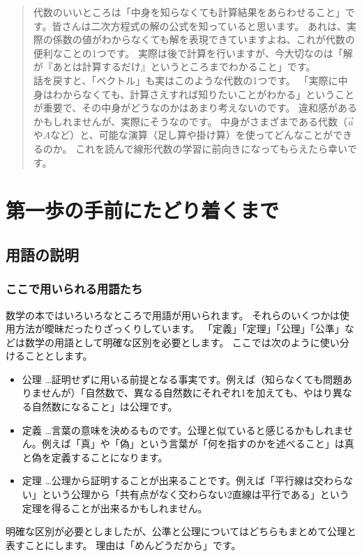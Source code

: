 \documentclass[report]{jlreq}%
\begin{document}
\begin{abstract}
\indent 代数のいいところは「中身を知らなくても計算結果をあらわせること」です。皆さんは二次方程式の解の公式を知っていると思います。
あれは、実際の係数の値がわからなくても解を表現できていますよね、これが代数の便利なことの1つです。
実際は後で計算を行いますが、今大切なのは「解が『あとは計算するだけ』というところまでわかること」です。\\

\indent 話を戻すと、「ベクトル」も実はこのような代数の1つです。
「実際に中身はわからなくても、計算さえすれば知りたいことがわかる」ということが重要で、その中身がどうなのかはあまり考えないのです。
違和感があるかもしれませんが、実際にそうなのです。
中身がさまざまである代数（$\vec{a}$や$A$など）と、可能な演算（足し算や掛け算）を使ってどんなことができるのか。
これを読んで線形代数の学習に前向きになってもらえたら幸いです。
\\

\end{abstract}

\tableofcontents{}

\part{第一歩の手前にたどり着くまで}
\chapter{用語の説明}
\section{ここで用いられる用語たち}
数学の本ではいろいろなところで用語が用いられます。
それらのいくつかは使用方法が曖昧だったりざっくりしています。
「定義」「定理」「公理」「公準」などは数学の用語として明確な区別を必要とします。
ここでは次のように使い分けることとします。
\begin{itemize}
	\item 公理 \dots 証明せずに用いる前提となる事実です。例えば（知らなくても問題ありませんが）「自然数で、異なる自然数にそれぞれ1を加えても、やはり異なる自然数になること」は公理です。
	\item 定義 \dots 言葉の意味を決めるものです。公理と似ていると感じるかもしれません。例えば「真」や「偽」という言葉が「何を指すのかを述べること」は真と偽を定義することになります。
	\item 定理 \dots 公理から証明することが出来ることです。例えば「平行線は交わらない」という公理から「共有点がなく交わらない2直線は平行である」という定理を得ることが出来るかもしれません。
\end{itemize}
明確な区別が必要としましたが、公準と公理についてはどちらもまとめて公理と表すことにします。
理由は「めんどうだから」です。
\end{document}
